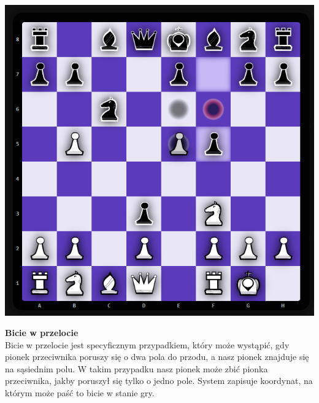 \documentclass[12pt,a4paper]{article}
\begin{document}
\begin{minipage}[t]{0.3\textwidth} 
    \vspace{0pt} 
    \centering 
    \includegraphics[width=\linewidth]{images/imp_front_enpassant.png} 
\end{minipage} 
\hfill 
\begin{minipage}[t]{0.6\textwidth} 
    \vspace{0pt} 
    \justifying 
    \noindent 
    \textbf{Bicie w przelocie}\\
    Bicie w przelocie jest specyficznym przypadkiem, który może wystąpić, gdy pionek przeciwnika poruszy się o dwa pola do przodu, a nasz pionek znajduje się na sąsiednim polu. W takim przypadku nasz pionek może zbić pionka przeciwnika, jakby poruszył się tylko o jedno pole. System zapisuje koordynat, na którym może paść to bicie w stanie gry.
\end{minipage}

\vspace{1cm}
\end{document}

